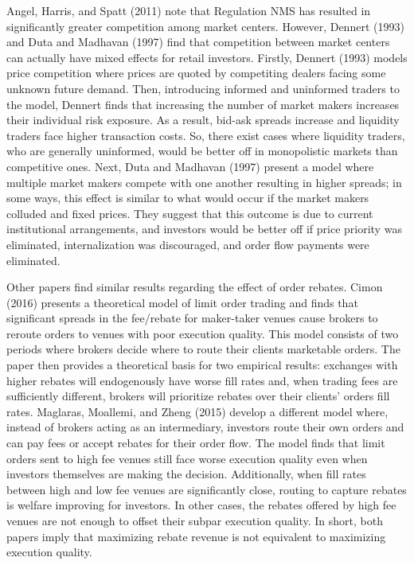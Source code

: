 \documentclass[12pt,a4paper]{article}
\begin{document}
		Angel, Harris, and Spatt (2011) note that Regulation NMS has resulted in significantly greater competition among market centers. However, Dennert (1993) and Duta and Madhavan (1997) find that competition between market centers can actually have mixed effects for retail investors. Firstly, Dennert (1993) models price competition where prices are quoted by competiting dealers facing some unknown future demand. Then, introducing informed and uninformed traders to the model, Dennert finds that increasing the number of market makers increases their individual risk exposure. As a result, bid-ask spreads increase and liquidity traders face higher transaction costs. So, there exist cases where liquidity traders, who are generally uninformed, would be better off in monopolistic markets than competitive ones. Next, Duta and Madhavan (1997) present a model where multiple market makers compete with one another resulting in higher spreads; in some ways, this effect is similar to what would occur if the market makers colluded and fixed prices. They suggest that this outcome is due to current institutional arrangements, and investors would be better off if price priority was eliminated, internalization was discouraged, and order flow payments were eliminated. 
		
		Other papers find similar results regarding the effect of order rebates. Cimon (2016) presents a theoretical model of limit order trading and finds that significant spreads in the fee/rebate for maker-taker venues cause brokers to reroute orders to venues with poor execution quality. This model consists of two periods where brokers decide where to route their clients marketable orders. The paper then provides a theoretical basis for two empirical results: exchanges with higher rebates will endogenously have worse fill rates and, when trading fees are sufficiently different, brokers will prioritize rebates over their clients' orders fill rates. Maglaras, Moallemi, and Zheng (2015) develop a different model where, instead of brokers acting as an intermediary, investors route their own orders and can pay fees or accept rebates for their order flow. The model finds that limit orders sent to high fee venues still face worse execution quality even when investors themselves are making the decision. Additionally, when fill rates between high and low fee venues are significantly close, routing to capture rebates is welfare improving for investors. In other cases, the rebates offered by high fee venues are not enough to offset their subpar execution quality. In short, both papers imply that maximizing rebate revenue is not equivalent to maximizing execution quality. 
		
\end{document}

